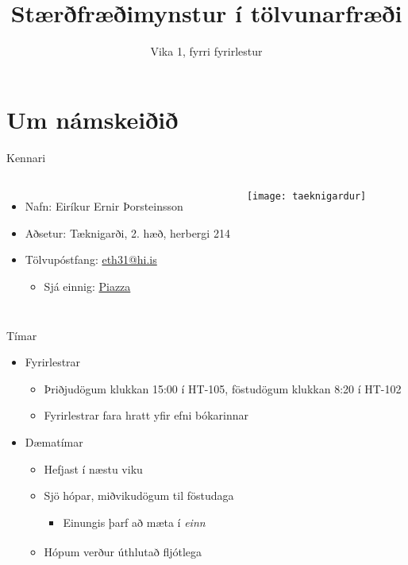 \documentclass[handout]{beamer}
\title{Stærðfræðimynstur í tölvunarfræði}
\subtitle{Vika 1, fyrri fyrirlestur}
\begin{document}
\begin{frame}
\titlepage
\end{frame}

\section{Um námskeiðið}

\begin{frame}{Kennari}
\begin{columns}
\begin{itemize}
 \item Nafn: Eiríkur Ernir Þorsteinsson
 \item Aðsetur: Tæknigarði, 2. hæð, herbergi 214
 \item Tölvupóstfang: \href{mailto:eth31@hi.is}{eth31@hi.is}
 \begin{itemize}
  \item Sjá einnig: \hyperlink{frame:piazza}{Piazza}
 \end{itemize}
\end{itemize}
\texttt{[image: taeknigardur]}
\end{columns}
\end{frame}

\begin{frame}{Tímar}
\begin{itemize}
 \item Fyrirlestrar
 \begin{itemize}
  \item Þriðjudögum klukkan 15:00 í HT-105, föstudögum klukkan 8:20 í HT-102
  \item Fyrirlestrar fara hratt yfir efni bókarinnar
 \end{itemize}
 \item Dæmatímar
 \begin{itemize}
  \item Hefjast í næstu viku
  \item Sjö hópar, miðvikudögum til föstudaga
  \begin{itemize}
   \item Einungis þarf að mæta í \emph{einn}
  \end{itemize}
  \item Hópum verður úthlutað fljótlega\textsuperscript{\textregistered}
 \end{itemize}
\end{itemize} 
\end{frame}
\end{document}
